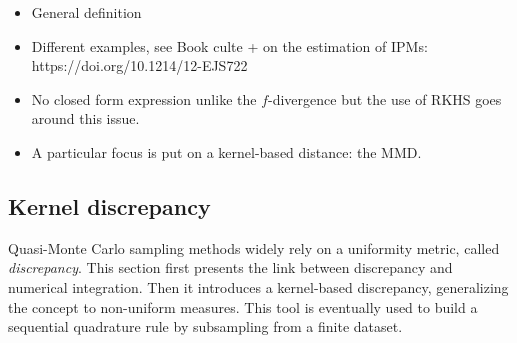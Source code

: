 \begin{itemize}
    \item General definition 
    \item Different examples, see Book culte + on the estimation of IPMs: https://doi.org/10.1214/12-EJS722
    \item No closed form expression unlike the $f$-divergence but the use of RKHS goes around this issue.
    \item A particular focus is put on a kernel-based distance: the MMD.
\end{itemize}



\subsection*{Kernel discrepancy}


Quasi-Monte Carlo sampling methods widely rely on a uniformity metric, called \textit{discrepancy}. 
This section first presents the link between discrepancy and numerical integration. 
Then it introduces a kernel-based discrepancy, generalizing the concept to non-uniform measures. 
This tool is eventually used to build a sequential quadrature rule by subsampling from a finite dataset.




